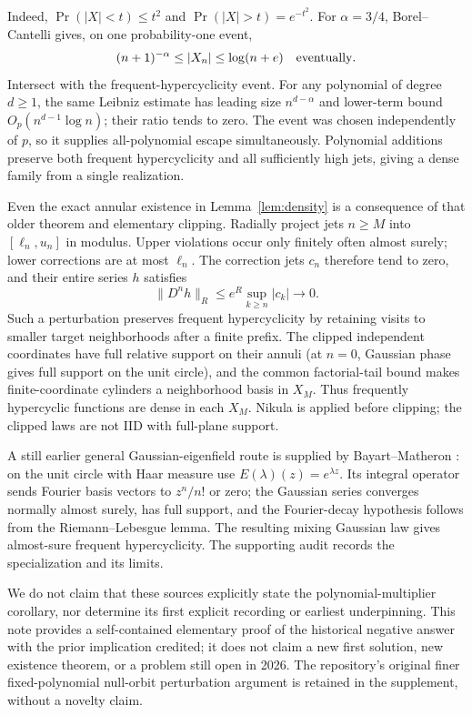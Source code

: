 \documentclass[11pt]{article}
\newcommand{\norm}[2]{\lVert #1\rVert_{#2}}
\begin{document}
Indeed, $\Pr(|X|<t)\le t^2$ and $\Pr(|X|>t)=e^{-t^2}$.
For $\alpha=3/4$, Borel--Cantelli gives, on one probability-one event,
\[
       (n+1)^{-\alpha}\le |X_n|\le\log(n+e)\quad\hbox{eventually}.
\]
Intersect with the frequent-hypercyclicity event. For any polynomial of
degree $d\ge1$, the same Leibniz estimate has leading size
$n^{d-\alpha}$ and lower-term bound $O_p(n^{d-1}\log n)$; their ratio
tends to zero. The event was chosen independently of $p$, so it supplies
all-polynomial escape simultaneously. Polynomial additions preserve both
frequent hypercyclicity and all sufficiently high jets, giving a dense
family from a single realization.

Even the exact annular existence in Lemma~\ref{lem:density} is a consequence
of that older theorem and elementary clipping. Radially project jets
$n\ge M$ into $[\ell_n,u_n]$ in modulus. Upper violations occur only finitely
often almost surely; lower corrections are at most $\ell_n$.
The correction jets $c_n$ therefore tend to zero, and their entire series
$h$ satisfies
\[
              \norm{D^nh}{R}\le e^R\sup_{k\ge n}|c_k|\longrightarrow0.
\]
Such a perturbation preserves frequent hypercyclicity by retaining visits
to smaller target neighborhoods after a finite prefix.
The clipped independent coordinates have full relative support on their
annuli (at $n=0$, Gaussian phase gives full support on the unit circle), and the common factorial-tail bound makes finite-coordinate cylinders
a neighborhood basis in $X_M$. Thus frequently hypercyclic functions are
dense in each $X_M$. Nikula is applied before clipping; the clipped laws
are not IID with full-plane support.

A still earlier general Gaussian-eigenfield route is supplied by
Bayart--Matheron \cite[arXiv v1, Prop.~3.3]{BayartMatheron}: on the unit
circle with Haar measure use $E(\lambda)(z)=e^{\lambda z}$.
Its integral operator sends Fourier basis vectors to $z^n/n!$ or zero;
the Gaussian series converges normally almost surely, has full support,
and the Fourier-decay hypothesis follows from the Riemann--Lebesgue lemma.
The resulting mixing Gaussian law gives almost-sure frequent hypercyclicity.
The supporting audit records the specialization and its limits.

We do not claim that these sources explicitly state the polynomial-multiplier
corollary, nor determine its first explicit recording or earliest underpinning.
This note provides a self-contained elementary proof of the historical
negative answer with the prior implication credited; it does not claim a
new first solution, new existence theorem, or a problem still open in 2026.
The repository's original finer fixed-polynomial null-orbit perturbation
argument is retained in the supplement, without a novelty claim.
\end{document}
